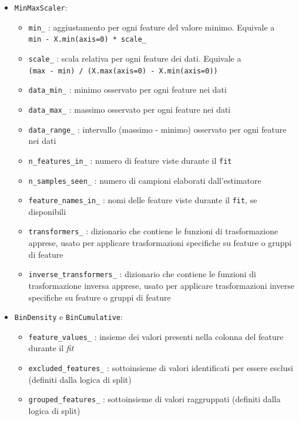 \begin{itemize}
\begin{itemize}
    \end{itemize}
    \item \texttt{MinMaxScaler}:
    \begin{itemize}
        \item \texttt{min\_} : aggiustamento per ogni feature del valore minimo. Equivale a \\ \texttt{min - X.min(axis=0) * scale\_}
        \item \texttt{scale\_} : scala relativa per ogni feature dei dati. Equivale a \\ \texttt{(max - min) / (X.max(axis=0) - X.min(axis=0))}
        \item \texttt{data\_min\_} : minimo osservato per ogni feature nei dati
        \item \texttt{data\_max\_} : massimo osservato per ogni feature nei dati
        \item \texttt{data\_range\_} : intervallo (massimo - minimo) osservato per ogni feature nei dati
        \item \texttt{n\_features\_in\_} : numero di feature viste durante il \texttt{fit}
        \item \texttt{n\_samples\_seen\_} : numero di campioni elaborati dall'estimatore
        \item \texttt{feature\_names\_in\_} : nomi delle feature viste durante il \texttt{fit}, se disponibili
        \item \texttt{transformers\_} : dizionario che contiene le funzioni di trasformazione apprese, usato per applicare trasformazioni specifiche su feature o gruppi di feature
        \item \texttt{inverse\_transformers\_} : dizionario che contiene le funzioni di trasformazione inversa apprese, usato per applicare trasformazioni inverse specifiche su feature o gruppi di feature
    \end{itemize}
    \item \texttt{BinDensity} e \texttt{BinCumulative}:
    \begin{itemize}
        \item \texttt{feature\_values\_} : insieme dei valori presenti nella colonna del feature durante il \textit{fit}
        \item \texttt{excluded\_features\_} : sottoinsieme di valori identificati per essere esclusi (definiti dalla logica di split)
        \item \texttt{grouped\_features\_} : sottoinsieme di valori raggruppati (definiti dalla logica di split)
    \end{itemize}
\end{itemize}

